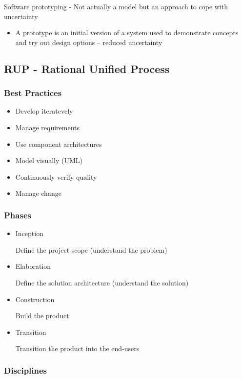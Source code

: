 \documentclass[../ESOF_notes.tex]{subfiles}
\begin{document}
Software prototyping - Not actually a model but an approach to cope with uncertainty
\begin{itemize}
    \item A prototype is an initial version of a system used to demonstrate concepts and try out design options – reduced uncertainty
\end{itemize}

\subsection{RUP - Rational Unified Process}

\subsubsection{Best Practices}
\begin{itemize}
    \item Develop iteratevely
    \item Manage requirements
    \item Use component architectures
    \item Model visually (UML)
    \item Continuously verify quality
    \item Manage change
\end{itemize}

\subsubsection{Phases}
\begin{itemize}
    \item Inception
    
    Define the project scope (understand the problem)
    \item Elaboration
    
    Define the solution architecture (understand the solution)
    \item Construction
    
    Build the product
    \item Transition
    
    Transition the product into the end-users
\end{itemize}

\subsubsection{Disciplines}
\end{document}
